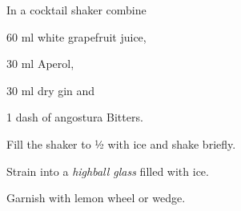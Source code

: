 \startsection[title={Pretty in Pink},reference=prettyinpink]
\startitemize
\item In a cocktail shaker combine
      \startitemize
      \item 60 ml white grapefruit juice,
      \item 30 ml Aperol,
      \item 30 ml dry gin and
      \item 1 dash of angostura Bitters.
      \stopitemize
\item Fill the shaker to ½ with ice and shake briefly.
\item Strain into a {\em highball glass} filled with ice.
\item Garnish with \tr lemon wheel or wedge.
\stopitemize
